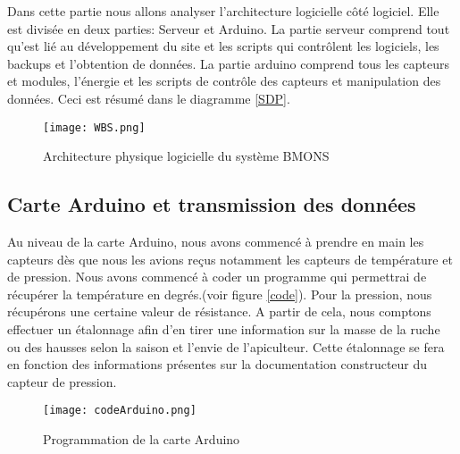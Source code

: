 \vspace{1.5cm}
Dans cette partie nous allons analyser l'architecture logicielle côté logiciel. Elle est divisée en deux parties: Serveur et Arduino. La partie serveur comprend tout qu'est lié au développement du site et les scripts qui contrôlent les logiciels, les backups et l'obtention de données. La partie arduino comprend tous les capteurs et modules, l'énergie et les scripts de contrôle des capteurs et manipulation des données. Ceci est résumé dans le diagramme \ref{SDP}. 


\begin{figure}[h!]
\centering\texttt{[image: WBS.png]}
\caption{\label{fig:SDP} Architecture physique logicielle du système BMONS}
\end{figure}

\newpage

\subsection{Carte Arduino et transmission des données}

Au niveau de la carte Arduino, nous avons commencé à prendre en main les capteurs dès que nous les avions reçus notamment les capteurs de température et de pression. Nous avons commencé à coder un programme qui permettrai de récupérer la température en degrés.(voir figure \ref{code}). Pour la pression, nous récupérons une certaine valeur de résistance. A partir de cela, nous comptons effectuer un étalonnage afin d'en tirer une information sur la masse de la ruche ou des hausses selon la saison et l'envie de l'apiculteur. Cette étalonnage se fera en fonction des informations présentes sur la documentation constructeur du capteur de pression. \\

\begin{figure}[h!]
\centering\texttt{[image: codeArduino.png]}
\caption{\label{fig:code} Programmation de la carte Arduino}
\end{figure}  

\clearpage